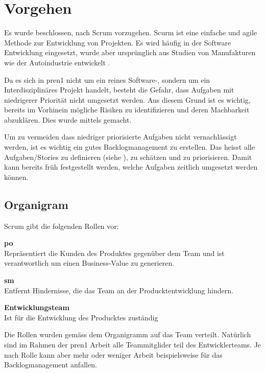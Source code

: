 \section{Vorgehen}

Es wurde beschlossen, nach Scrum \cite{Wikipedia-Scrum} vorzugehen.
Scurm ist eine einfache und agile Methode zur Entwicklung von Projekten. Es wird häufig in der 
Software Entwicklung eingesetzt, wurde aber ursprünglich aus Studien von Manufakturen wie der Autoindustrie entwickelt \cite{Wikipedia-Scrum-History}.

Da es sich in \acrshort{pren}1 nicht um ein reines Software-, sondern um
ein Interdisziplinäres Projekt handelt, besteht die Gefahr, dass Aufgaben
mit niedrigerer Priorität nicht umgesetzt werden. Aus diesem Grund ist es
wichtig, bereits im Vorhinein mögliche Risiken zu identifizieren und deren Machbarkeit
abzuklären. Dies wurde mittels  gemacht.

Um zu vermeiden dass niedriger priorisierte Aufgaben nicht vernachlässigt werden,
ist es wichtig ein gutes Backlogmanagement zu erstellen. Das heisst alle Aufgaben/Stories
zu definieren (siehe ), zu schätzen und zu priorisieren.
Damit kann bereits früh festgestellt werden, welche Aufgaben zeitlich umgesetzt werden 
können.

\subsection{Organigram}

Scrum gibt die folgenden Rollen vor:

\begin{items}
  \item {\bf \acrfull{po}} \\
    Repräsentiert die Kunden des Produktes gegenüber dem Team 
    und ist verantwortlich um einen Business-Value zu generieren.
  \item {\bf \acrfull{sm}} \\
    Entfernt Hindernisse, die das Team an der Producktentwicklung hindern.
  \item {\bf Entwicklungsteam} \\
    Ist für die Entwicklung des Producktes zuständig
\end{items}

Die Rollen wurden gemäss dem Organigramm auf das Team verteilt. Natürlich sind 
im Rahmen der \acrshort{pren}1 Arbeit alle Teammitglider teil des Entwicklerteams.
Je nach Rolle kann aber mehr oder weniger Arbeit beispielsweise für das Backlogmanagement anfallen.

